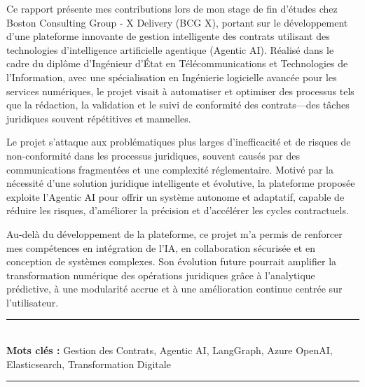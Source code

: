 Ce rapport présente mes contributions lors de mon stage de fin d’études chez Boston Consulting Group - X Delivery (BCG X), portant sur le développement d’une plateforme innovante de gestion intelligente des contrats utilisant des technologies d’intelligence artificielle agentique (Agentic AI). Réalisé dans le cadre du diplôme d’Ingénieur d’État en Télécommunications et Technologies de l’Information, avec une spécialisation en Ingénierie logicielle avancée pour les services numériques, le projet visait à automatiser et optimiser des processus tels que la rédaction, la validation et le suivi de conformité des contrats—des tâches juridiques souvent répétitives et manuelles.\mynewline

Le projet s’attaque aux problématiques plus larges d’inefficacité et de risques de non-conformité dans les processus juridiques, souvent causés par des communications fragmentées et une complexité réglementaire. Motivé par la nécessité d’une solution juridique intelligente et évolutive, la plateforme proposée exploite l’Agentic AI pour offrir un système autonome et adaptatif, capable de réduire les risques, d’améliorer la précision et d’accélérer les cycles contractuels.\mynewline

Au-delà du développement de la plateforme, ce projet m’a permis de renforcer mes compétences en intégration de l’IA, en collaboration sécurisée et en conception de systèmes complexes. Son évolution future pourrait amplifier la transformation numérique des opérations juridiques grâce à l’analytique prédictive, à une modularité accrue et à une amélioration continue centrée sur l’utilisateur.

\bigskip

\noindent\rule{\linewidth}{0.3mm} \\[0.4cm] 
\textbf{Mots clés :}
Gestion des Contrats, Agentic AI, LangGraph, Azure OpenAI, Elasticsearch, Transformation Digitale
\\[0.1cm]
\noindent\rule{\linewidth}{0.3mm} \\[0.6cm] 
